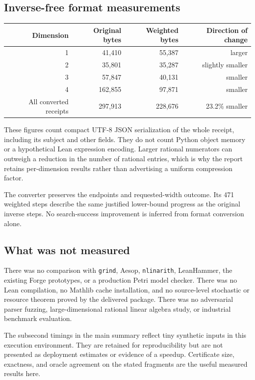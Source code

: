 \documentclass[11pt,a4paper]{article}
\theoremstyle{definition}\newtheorem{definition}[theorem]{Definition}
\theoremstyle{remark}\newtheorem{remark}[theorem]{Remark}
\newcommand{\code}[1]{\nolinkurl{#1}}
\begin{document}
\subsection{Inverse-free format measurements}
\begin{center}
\begin{tabular}{rrrr}
\toprule
Dimension & Original bytes & Weighted bytes & Direction of change \\
\midrule
1 & 41,410 & 55,387 & larger \\
2 & 35,801 & 35,287 & slightly smaller \\
3 & 57,847 & 40,131 & smaller \\
4 & 162,855 & 97,871 & smaller \\
\midrule
All converted receipts & 297,913 & 228,676 & 23.2\% smaller \\
\bottomrule
\end{tabular}
\end{center}
These figures count compact UTF-8 JSON serialization of the whole receipt, including its subject and other fields. They do not count Python object memory or a hypothetical Lean expression encoding. Larger rational numerators can outweigh a reduction in the number of rational entries, which is why the report retains per-dimension results rather than advertising a uniform compression factor.

The converter preserves the endpoints and requested-width outcome. Its 471 weighted steps describe the same justified lower-bound progress as the original inverse steps. No search-success improvement is inferred from format conversion alone.

\subsection{What was not measured}
There was no comparison with \code{grind}, Aesop, \code{nlinarith}, LeanHammer, the existing Forge prototypes, or a production Petri model checker. There was no Lean compilation, no Mathlib cache installation, and no source-level stochastic or resource theorem proved by the delivered package. There was no adversarial parser fuzzing, large-dimensional rational linear algebra study, or industrial benchmark evaluation.

The subsecond timings in the main summary reflect tiny synthetic inputs in this execution environment. They are retained for reproducibility but are not presented as deployment estimates or evidence of a speedup. Certificate size, exactness, and oracle agreement on the stated fragments are the useful measured results here.
\end{document}

